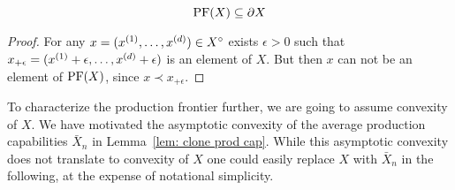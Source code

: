 \begin{lemma}
	\label{lem: prod frontier part of boundary}
	\[
		\operatorname{PF}(X)\subseteq \partial X
	\]
\end{lemma}
\begin{proof}
	For any \(x=(x^{(1)},\dots, x^{(d)})\in X^\circ\) exists \(\epsilon>0\)
	such that \(x_{+\epsilon} = (x^{(1)}+\epsilon, \dots, x^{(d)}+\epsilon)\)
	is an element of \(X\). But then \(x\) can not be an element of \(\operatorname{PF}(X)\),
	since \(x \prec x_{+\epsilon}\).
\end{proof}

To characterize the production frontier further, we are going to assume
convexity of \(X\). We have motivated the asymptotic convexity of the
average production capabilities \(\bar{X}_n\) in Lemma~\ref{lem: clone prod
cap}. While this asymptotic convexity does not translate to convexity of \(X\)
one could easily replace \(X\) with \(\bar{X}_n\) in the following, at the
expense of notational simplicity.

